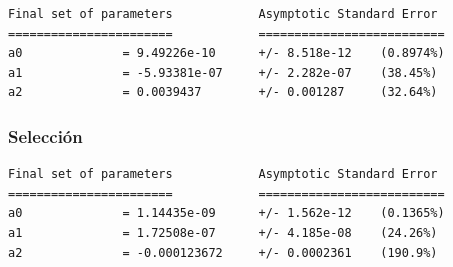 \documentclass[a4]{article}
\begin{document}
\begin{verbatim}
Final set of parameters            Asymptotic Standard Error
=======================            ==========================
a0              = 9.49226e-10      +/- 8.518e-12    (0.8974%)
a1              = -5.93381e-07     +/- 2.282e-07    (38.45%)
a2              = 0.0039437        +/- 0.001287     (32.64%)
\end{verbatim}

\begin{figure}[H]
  \centering
\end{figure}

\subsubsection{Selección}
\begin{verbatim}
Final set of parameters            Asymptotic Standard Error
=======================            ==========================
a0              = 1.14435e-09      +/- 1.562e-12    (0.1365%)
a1              = 1.72508e-07      +/- 4.185e-08    (24.26%)
a2              = -0.000123672     +/- 0.0002361    (190.9%)
\end{verbatim}

\begin{figure}[H]
  \centering
\end{figure}
\end{document}
